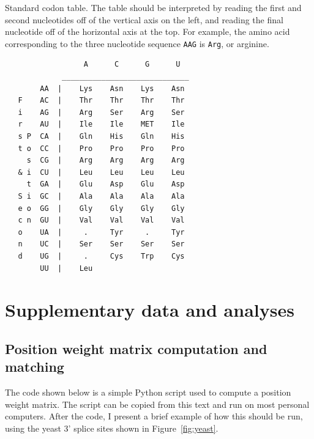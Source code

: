     \begin{table}[tbph]
    \caption[Standard codon table]{Standard codon table.  The table
    should be interpreted by reading the first and second
    nucleotides off of the vertical axis on the left, and reading
    the final nucleotide off of the horizontal axis at the top.
    For example, the amino acid corresponding to the three
    nucleotide sequence \texttt{AAG} is \texttt{Arg}, or arginine.
    }\label{table:codonTable}
    \centering
\begin{verbatim}
                  A      C      G      U
             _____________________________
        AA  |    Lys    Asn    Lys    Asn
   F    AC  |    Thr    Thr    Thr    Thr
   i    AG  |    Arg    Ser    Arg    Ser
   r    AU  |    Ile    Ile    MET    Ile
   s P  CA  |    Gln    His    Gln    His
   t o  CC  |    Pro    Pro    Pro    Pro
     s  CG  |    Arg    Arg    Arg    Arg
   & i  CU  |    Leu    Leu    Leu    Leu
     t  GA  |    Glu    Asp    Glu    Asp
   S i  GC  |    Ala    Ala    Ala    Ala
   e o  GG  |    Gly    Gly    Gly    Gly
   c n  GU  |    Val    Val    Val    Val
   o    UA  |     .     Tyr     .     Tyr
   n    UC  |    Ser    Ser    Ser    Ser
   d    UG  |     .     Cys    Trp    Cys
        UU  |    Leu
\end{verbatim}

    \end{table}


\clearpage

\section{Supplementary data and analyses}

\subsection{Position weight matrix computation and matching}\label{section:pwmCode}

The code shown below is a simple Python script used to compute a
position weight matrix.  The script can be copied from this text and
run on most personal computers.  After the code, I present a brief
example of how this should be run, using the yeast 3' splice sites
shown in Figure~\vref{fig:yeast}.

\begin{singlespace}
\small

\normalsize
\end{singlespace}

